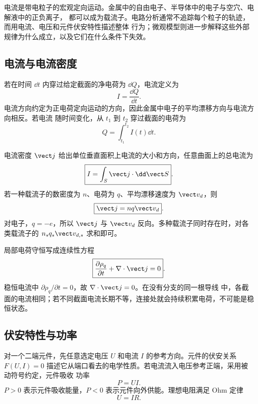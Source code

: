 

\iffalse
电流是带电粒子的宏观定向运动。金属中的自由电子、半导体中的电子与空穴、电解液中的正负离子，
都可以成为载流子。电路分析通常不追踪每个粒子的轨迹，而用电流、电压和元件伏安特性描述整体
行为；微观模型则进一步解释这些外部规律为什么成立，以及它们在什么条件下失效。

\subsection*{电流与电流密度}

若在时间 $\dd t$ 内穿过给定截面的净电荷为 $\dd Q$，电流定义为
\begin{equation}
  \boxed{I=\frac{\dd Q}{\dd t}}.
\end{equation}
电流方向约定为正电荷定向运动的方向，因此金属中电子的平均漂移方向与电流方向相反。若电流
随时间变化，从 $t_1$ 到 $t_2$ 穿过截面的电荷为
\begin{equation}
  \boxed{Q=\int_{t_1}^{t_2}I(t)\dd t}.
\end{equation}

电流密度 $\vect j$ 给出单位垂直面积上电流的大小和方向，任意曲面上的总电流为
\begin{equation}
  \boxed{I=\int_S\vect j\cdot\dd\vect S}.
\end{equation}
若一种载流子的数密度为 $n$、电荷为 $q$、平均漂移速度为 $\vect v_d$，则
\begin{equation}
  \boxed{\vect j=nq\vect v_d}.
\end{equation}
对电子，$q=-e$，所以 $\vect j$ 与 $\vect v_d$ 反向。多种载流子同时存在时，对各类载流子的
$n_sq_s\vect v_{d,s}$ 求和即可。

\currentDensityDiagram

局部电荷守恒写成连续性方程
\begin{equation}
  \boxed{\frac{\partial\rho_q}{\partial t}+\nabla\cdot\vect j=0}.
\end{equation}
稳恒电流中 $\partial\rho_q/\partial t=0$，故 $\nabla\cdot\vect j=0$。在没有分支的同一根导线
中，各截面的电流相同；若不同截面电流长期不等，连接处就会持续积累电荷，不可能是稳恒状态。

\subsection*{伏安特性与功率}

对一个二端元件，先任意选定电压 $U$ 和电流 $I$ 的参考方向。元件的伏安关系
$F(U,I)=0$ 描述它从端口看去的电学性质。若电流流入电压参考正端，采用被动符号约定，元件吸收
功率
\begin{equation}
  \boxed{P=UI}.
\end{equation}
$P>0$ 表示元件吸收能量，$P<0$ 表示元件向外供能。理想电阻满足 Ohm 定律
\begin{equation}
  \boxed{U=IR}.
\end{equation}

